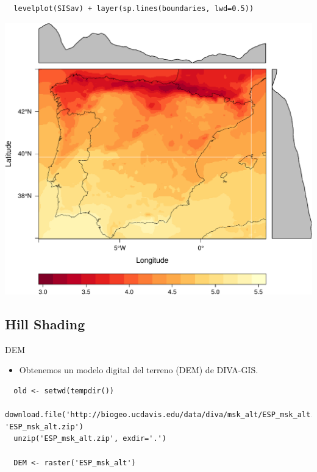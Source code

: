 \documentclass[xcolor={usenames,svgnames,dvipsnames}]{beamer}
\begin{document}
\begin{frame}[fragile,label=sec-2-2-4]{}
 \lstset{language=R,label= ,caption= ,numbers=none}
\begin{lstlisting}
  levelplot(SISav) + layer(sp.lines(boundaries, lwd=0.5))
\end{lstlisting}

\includegraphics[width=.9\linewidth]{figs/leveplotSISavBoundaries.pdf}
\end{frame}

\subsection{Hill Shading}
\label{sec-2-3}
\begin{frame}[fragile,label=sec-2-3-1]{DEM}
 \begin{itemize}
\item Obtenemos un modelo digital del terreno (DEM) de DIVA-GIS.
\end{itemize}

\lstset{language=R,label= ,caption= ,numbers=none}
\begin{lstlisting}
  old <- setwd(tempdir())
  download.file('http://biogeo.ucdavis.edu/data/diva/msk_alt/ESP_msk_alt.zip', 'ESP_msk_alt.zip')
  unzip('ESP_msk_alt.zip', exdir='.')
  
  DEM <- raster('ESP_msk_alt')
\end{lstlisting}
\end{frame}
\end{document}
